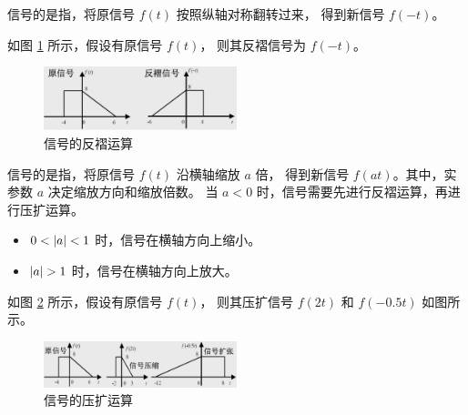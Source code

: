 \begin{definition}[反褶运算]
    信号的是指，将原信号 $f(t)$ 按照纵轴对称翻转过来，
    得到新信号 $f(-t)$。
\end{definition}

\begin{example}
    如图 \ref{fig:waveform-symmetry} 所示，假设有原信号 $f(t)$，
    则其反褶信号为 $f(-t)$。
    \begin{figure}[H]
        \centering
        \includegraphics[width=0.5\textwidth]{chap1/img/waveform-symmetry.png}
        \caption{信号的反褶运算}
        \label{fig:waveform-symmetry}
    \end{figure}
\end{example}

\begin{definition}[压扩运算]
    信号的是指，将原信号 $f(t)$ 沿横轴缩放 $a$ 倍，
    得到新信号 $f(at)$。其中，实参数 $a$ 决定缩放方向和缩放倍数。
    当 $a < 0$ 时，信号需要先进行反褶运算，再进行压扩运算。
    \begin{itemize}
        \item $0 < \left|a\right| < 1$ 时，信号在横轴方向上缩小。
        \item $\left|a\right| > 1$ 时，信号在横轴方向上放大。
    \end{itemize}
\end{definition}

\begin{example}
    如图 \ref{fig:waveform-scaling} 所示，假设有原信号 $f(t)$，
    则其压扩信号 $f(2t)$ 和 $f(-0.5t)$ 如图所示。
    \begin{figure}[H]
        \centering
        \includegraphics[width=0.5\textwidth]{chap1/img/waveform-scaling.png}
        \caption{信号的压扩运算}
        \label{fig:waveform-scaling}
    \end{figure}
\end{example}

